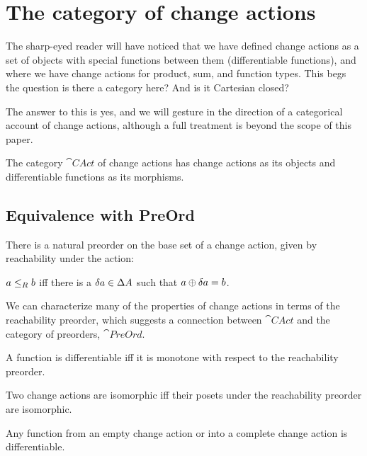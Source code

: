 \section{The category of change actions}
\label{sec:category}

The sharp-eyed reader will have noticed that we have defined change actions as a
set of objects with special functions between them (differentiable functions),
and where we have change actions for product, sum, and function types. This begs
the question \textemdash{} is there a category here? And is it Cartesian closed?

The answer to this is yes, and we will gesture in the direction of a categorical
account of change actions, although a full treatment is beyond the scope of this paper.

\begin{defn}
  The category $\cat{CAct}$ of change actions has change actions as its objects and
  differentiable functions as its morphisms. 
\end{defn}

\subsection{Equivalence with PreOrd}

There is a natural preorder on the base set of a change action, given by reachability
under the action:

\begin{defn}
  $a \leq_R b$ iff there is a $\delta a \in \Delta A$ such that $a \oplus
  \delta a = b$.
\end{defn}

We can characterize many of the properties of change actions in terms of the reachability preorder,
which suggests a connection between $\cat{CAct}$ and the category of preorders, $\cat{PreOrd}$.

\begin{prop}
  A function is differentiable iff it is monotone with respect to the
  reachability preorder. 
\end{prop}

\begin{corollary}
  Two change actions are isomorphic iff their posets under the reachability
  preorder are isomorphic.
\end{corollary}

\begin{corollary}
  Any function from an empty change action or into a complete change
  action is differentiable.
\end{corollary}

